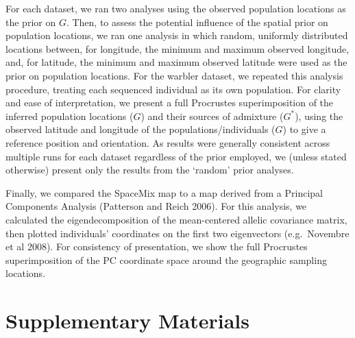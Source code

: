 \documentclass[12pt]{article}
\newcommand{\identifyadmixsource}[1]{{#1^{*}}}
\begin{document}
For each dataset, we ran two analyses using the observed population locations as the prior on $G$.  
Then, to assess the potential influence of the spatial prior on population locations, 
we ran one analysis in which random, uniformly distributed locations between, 
for longitude, the minimum and maximum observed longitude, 
and, for latitude, the minimum and maximum observed latitude were used as the prior on population locations.  
For the warbler dataset, we repeated this analysis procedure, treating each sequenced individual as its own population.  
For clarity and ease of interpretation, we present a full Procrustes superimposition of the inferred population locations ($G$) 
and their sources of admixture ($\identifyadmixsource{G}$), 
using the observed latitude and longitude of the populations/individuals ($G$) to give a reference position and orientation.  
As results were generally consistent across multiple runs for each dataset regardless of the prior employed, 
we (unless stated otherwise) present only the results from the `random' prior analyses.

Finally, we compared the SpaceMix map to a map derived from a Principal Components Analysis (Patterson and Reich 2006).  For this analysis, we calculated the eigendecomposition of the mean-centered allelic covariance matrix, then plotted individuals' coordinates on the first two eigenvectors (e.g.\ Novembre et al 2008).  For consistency of presentation, we show the full Procrustes superimposition of the PC coordinate space around the geographic sampling locations.


\newpage



\newpage



\setcounter{table}{0}
\renewcommand{\thetable}{S\arabic{table}}
\setcounter{figure}{0}
\renewcommand{\thefigure}{S\arabic{figure}}

\section*{Supplementary Materials}
\end{document}
